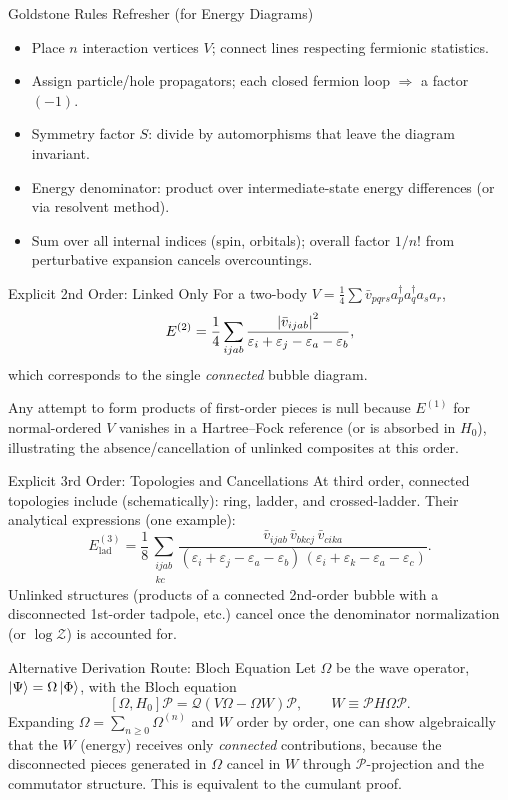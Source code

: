 \documentclass[aspectratio=169,11pt]{beamer}
\newcommand{\Hn}{H_0}
\newcommand{\V}{V}
\newcommand{\Pcal}{\mathcal{P}}
\newcommand{\Qcal}{\mathcal{Q}}
\newcommand{\Wop}{W}
\newcommand{\ketPhi}{\ket{\Phi}}                      %
\newcommand{\Z}{\mathcal{Z}}
\begin{document}
\begin{frame}{Goldstone Rules Refresher (for Energy Diagrams)}
\begin{itemize}
  \item Place $n$ interaction vertices $\V$; connect lines respecting fermionic statistics.
  \item Assign particle/hole propagators; each closed fermion loop $\Rightarrow$ a factor $(-1)$.
  \item Symmetry factor $S$: divide by automorphisms that leave the diagram invariant.
  \item Energy denominator: product over intermediate-state energy differences (or via resolvent method).
  \item Sum over all internal indices (spin, orbitals); overall factor $1/n!$ from perturbative expansion cancels overcountings.
\end{itemize}
\end{frame}

\begin{frame}{Explicit 2nd Order: Linked Only}
For a two-body $\V=\tfrac{1}{4}\sum \bar{v}_{pqrs} a_p^\dagger a_q^\dagger a_s a_r$,
\[
E^{(2)} = \frac{1}{4}\sum_{ijab} \frac{\abs{\bar{v}_{ijab}}^2}{\varepsilon_i+\varepsilon_j-\varepsilon_a-\varepsilon_b},
\]
which corresponds to the single \emph{connected} bubble diagram.\medskip

Any attempt to form products of first-order pieces is null because $E^{(1)}$ for normal-ordered $V$ vanishes in a Hartree–Fock reference (or is absorbed in $\Hn$), illustrating the absence/cancellation of unlinked composites at this order.
\end{frame}

\begin{frame}{Explicit 3rd Order: Topologies and Cancellations}
At third order, connected topologies include (schematically): ring, ladder, and crossed-ladder. Their analytical expressions (one example):
\[
E^{(3)}_{\text{lad}}=\frac{1}{8}\sum_{\substack{ijab\\kc}}
\frac{\bar{v}_{ijab}\,\bar{v}_{bk cj}\,\bar{v}_{ci ka}}
{(\varepsilon_i+\varepsilon_j-\varepsilon_a-\varepsilon_b)\,(\varepsilon_i+\varepsilon_k-\varepsilon_a-\varepsilon_c)}.
\]
Unlinked structures (products of a connected 2nd-order bubble with a disconnected 1st-order tadpole, etc.) cancel once the denominator normalization (or $\log\Z$) is accounted for.
\end{frame}


\begin{frame}{Alternative Derivation Route: Bloch Equation}
Let $\Omega$ be the wave operator, $\ket{\Psi}=\Omega\ketPhi$, with the Bloch equation
\[
[\Omega,\Hn]\Pcal = \Qcal(\V\Omega - \Omega \Wop)\Pcal,\qquad
\Wop \equiv \Pcal H \Omega \Pcal.
\]
Expanding $\Omega=\sum_{n\ge 0}\Omega^{(n)}$ and $\Wop$ order by order, one can show algebraically that the $\Wop$ (energy) receives only \emph{connected} contributions, because the disconnected pieces generated in $\Omega$ cancel in $\Wop$ through $\Pcal$-projection and the commutator structure. This is equivalent to the cumulant proof.
\end{frame}
\end{document}
